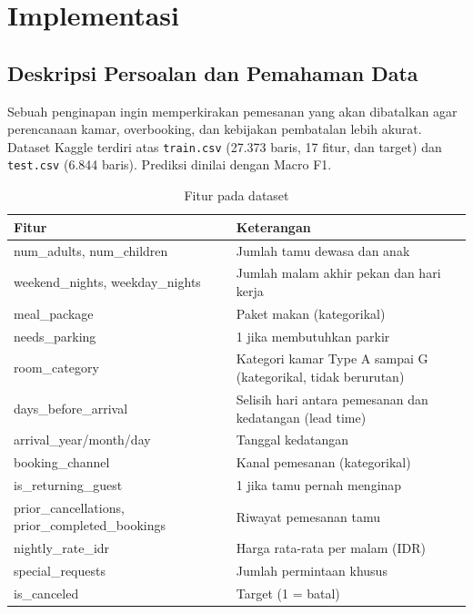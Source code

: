 \chapter{Implementasi}

\section{Deskripsi Persoalan dan Pemahaman Data}
Sebuah penginapan ingin memperkirakan pemesanan yang akan dibatalkan agar perencanaan kamar, overbooking, dan kebijakan pembatalan lebih akurat. Dataset Kaggle terdiri atas \texttt{train.csv} (27.373 baris, 17 fitur, dan target) dan \texttt{test.csv} (6.844 baris). Prediksi dinilai dengan Macro F1.

\begin{table}[H]
\centering
\caption{Fitur pada dataset}
\label{tab:fitur}
\begin{tabularx}{\textwidth}{>{\ttfamily\raggedright\arraybackslash}p{6.2cm}X}
\toprule
\normalfont\textbf{Fitur} & \textbf{Keterangan} \\
\midrule
num\_adults, num\_children & Jumlah tamu dewasa dan anak \\
weekend\_nights, weekday\_nights & Jumlah malam akhir pekan dan hari kerja \\
meal\_package & Paket makan (kategorikal) \\
needs\_parking & 1 jika membutuhkan parkir \\
room\_category & Kategori kamar Type A sampai G (kategorikal, tidak berurutan) \\
days\_before\_arrival & Selisih hari antara pemesanan dan kedatangan (lead time) \\
arrival\_year/month/day & Tanggal kedatangan \\
booking\_channel & Kanal pemesanan (kategorikal) \\
is\_returning\_guest & 1 jika tamu pernah menginap \\
prior\_cancellations, prior\_completed\_bookings & Riwayat pemesanan tamu \\
nightly\_rate\_idr & Harga rata-rata per malam (IDR) \\
special\_requests & Jumlah permintaan khusus \\
is\_canceled & Target (1 = batal) \\
\bottomrule
\end{tabularx}
\end{table}

